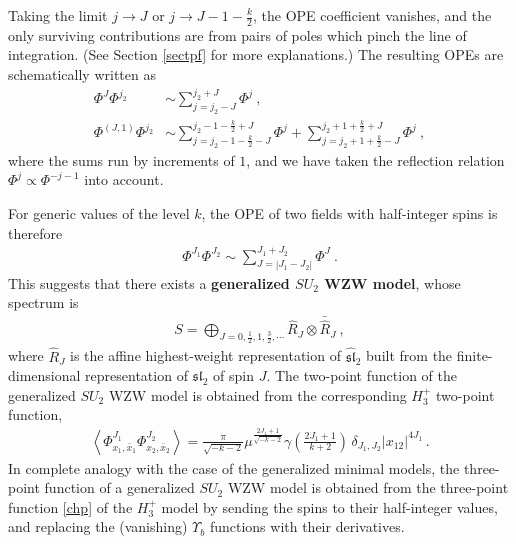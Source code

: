 \documentclass[12pt,a4paper,notitlepage]{report}
\numberwithin{equation}{section}
\theoremstyle{break}
\begin{document}
Taking the limit $j\rightarrow J$ or $j\rightarrow J-1-\frac{k}{2}$, the OPE coefficient vanishes, and the only surviving contributions are from pairs of poles which pinch the line of integration. (See Section \ref{sectpf} for more explanations.) The resulting OPEs are schematically written as 
\begin{align}
 \Phi^J \Phi^{j_2} & \sim \sum_{j=j_2-J}^{j_2+J} \Phi^j \ ,
\label{pjp}
\\
\Phi^{(J,1)}\Phi^{j_2} & \sim \sum_{j=j_2-1-\frac{k}{2}-J}^{j_2-1-\frac{k}{2}+J} \Phi^j + \sum_{j=j_2+1+\frac{k}{2}-J}^{j_2+1+\frac{k}{2}+J} \Phi^j\ ,
\label{pjop}
\end{align}
where the sums run by increments of $1$, and we have taken the reflection relation $\Phi^j\propto \Phi^{-j-1}$ into account. 

For generic values of the level $k$, the OPE of two fields with half-integer spins is therefore 
\begin{align}
 \boxed{\Phi^{J_1}\Phi^{J_2} \sim \sum_{J=|J_1-J_2|}^{J_1+J_2} \Phi^J}\ .
\end{align}
This suggests that there exists a \textbf{\boldmath generalized $SU_2$ WZW model}, whose spectrum is 
\begin{align}
 \boxed{S = \bigoplus_{J=0,\frac12,1,\frac32,\cdots} \hat{R}_J \otimes \bar{\hat{R}}_J}\ ,
\end{align}
where $\hat{R}_J$ is the affine highest-weight representation of $\widehat{\mathfrak{sl}}_2$ built from the finite-dimensional representation of $\mathfrak{sl}_2$ of spin $J$.
The two-point function of the generalized $SU_2$ WZW model is obtained from the corresponding $H_3^+$ two-point function, 
\begin{align}
 \left\langle \Phi^{J_1}_{x_1,\bar{x}_1} \Phi^{J_2}_{x_2,\bar{x}_2} \right\rangle = \frac{\pi}{\sqrt{-k-2}}\mu^{\frac{2J_1+1}{\sqrt{-k-2}}} \gamma(\tfrac{2J_1+1}{k+2})\, \delta_{J_1,J_2}|x_{12}|^{4J_1}\, .
\label{pjpjd}
\end{align}
In complete analogy with the case of the generalized minimal models, the three-point function of a generalized $SU_2$ WZW model is obtained from the three-point function \eqref{chp} of the $H_3^+$ model by sending the spins to their half-integer values, and replacing the (vanishing) $\Upsilon_b$ functions with their derivatives. 
\end{document}
